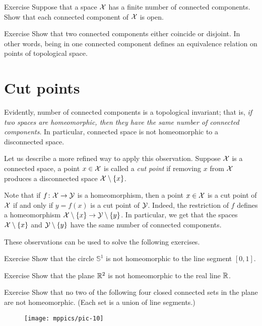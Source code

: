 \begin{thm}{Exercise}\label{ex:finite-number-connected-component}
Suppose that a space $\mathcal{X}$ has a finite number of connected components.
Show that each connected component of $\mathcal{X}$ is open.
\end{thm}

\begin{thm}{Exercise}\label{ex:connected-component-disjoint}
Show that two connected components either coincide or disjoint.
In other words, being in one connected component defines an equivalence relation on points of topological space.
\end{thm}



\section{Cut points}

Evidently, number of connected components is a topological invariant;
that is, \textit{if two spaces are homeomorphic, then they have the same number of connected components}.
In particular, connected space is not homeomorphic to a disconnected space.

Let us describe a more refined way to apply this observation.
Suppose $\mathcal{X}$ is a connected space, a point $x \in\mathcal{X}$ is called a \emph{cut point} if removing $x$ from $\mathcal{X}$ produces a disconnected space $\mathcal{X}\setminus\{x\}$.

Note that if $f\colon\mathcal{X}\to \mathcal{Y}$ is a homeomorphism, then a point $x \in\mathcal{X}$ is a cut point of $\mathcal{X}$ if and only if $y=f(x)$ is a cut point of $\mathcal{Y}$.
Indeed, the restriction of $f$ defines a homeomorphism $\mathcal{X}\setminus\{x\}\to \mathcal{Y}\setminus\{y\}$.
In particular, we get that the spaces $\mathcal{X}\setminus\{x\}$ and $\mathcal{Y}\setminus\{y\}$ have the same number of connected components.

These observations can be used to solve the following exercises.

\begin{thm}{Exercise}\label{ex:S1ne[0,1]}
Show that the circle $\mathbb{S}^1$ is not homeomorphic to the line segment $[0,1]$.
\end{thm}

\begin{thm}{Exercise}\label{ex:R2neR}
Show that the plane $\mathbb{R}^2$ is not homeomorphic to the real line $\mathbb{R}$.
\end{thm}
{

\begin{thm}{Exercise}\label{ex:not-homeo}
Show that no two of the following four closed connected sets in the plane are not homeomorphic.
(Each set is a union of line segments.)

\begin{figure}[!ht]
\centering
\texttt{[image: mppics/pic-10]}
\end{figure}

\end{thm}

}

